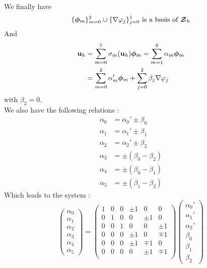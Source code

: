 We finally have \[ \{\bm{\phi}_m\}_{m=0}^2\cup\{{\nabla}\varphi_j\}_{j=0}^1
\mbox{ is a basis of } {\bm{\mathcal{Z}}}_h \]
And
\begin{align*}
{\mathbf{u}}_h &= \sum_{m=0}^5 \sigma_m({\mathbf{u}}_h) \bm{\phi}_m = \sum_{m=1}^6 \alpha_m \bm{\phi}_m\\
&= \sum_{m=0}^2 \alpha_m'\bm{\phi}_m + \sum_{j=0}^2 \beta_j{\nabla}\varphi_j
\end{align*}
with $\beta_2 = 0$.\\

We also have the following relations :
\begin{align*}
\alpha_0 &= \alpha_0' \pm \beta_0\\
\alpha_1 &= \alpha_1' \pm \beta_1\\
\alpha_2 &= \alpha_2' \pm \beta_2\\
\alpha_3 &= \pm(\beta_0-\beta_2)\\
\alpha_4 &= \pm(\beta_0-\beta_1)\\
\alpha_5 &= \pm(\beta_1-\beta_2)
\end{align*}
Which leads to the system :
\[ \begin{pmatrix}
\alpha_0\\\alpha_1\\\alpha_2\\\alpha_3\\\alpha_4\\\alpha_5
\end{pmatrix} = \begin{pmatrix}
1 & 0 & 0 & \pm 1 & 0 & 0\\
0 & 1 & 0 & 0 & \pm 1 & 0\\
0 & 0 & 1 & 0 & 0 & \pm 1\\
0 & 0 & 0 & \pm 1 & 0 & \mp 1\\
0 & 0 & 0 & \pm 1 & \mp 1 & 0\\
0 & 0 & 0 & 0 & \pm 1 & \mp 1\\
\end{pmatrix} \begin{pmatrix}
\alpha_0'\\\alpha_1'\\\alpha_2'\\\beta_0\\\beta_1\\\beta_2
\end{pmatrix} \]
